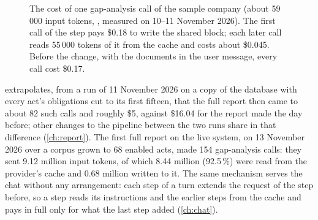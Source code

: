 \begin{figure}[H]
\centering
{}
\caption{The cost of one gap-analysis call of the sample company (about 59\,000 input
tokens, , measured on 10--11 November 2026). The first call of the step
pays \$0.18 to write the shared block; each later call reads 55\,000 tokens of it from the
cache and costs about \$0.045. Before the change, with the documents in the user message,
every call cost \$0.17.}\label{fig:models:cachecost}
\end{figure}

 extrapolates, from a run of 11 November 2026 on a copy of the
database with every act's obligations cut to its first fifteen, that the full report then
came to about 82 such calls and roughly \$5, against \$16.04 for the report made the day
before; other changes to the pipeline between the two runs share in that difference
(\cref{ch:report}). The first full report on the live system, on 13 November 2026 over a
corpus grown to 68 enabled acts, made 154 gap-analysis calls: they sent 9.12 million input
tokens, of which 8.44 million (92.5\,\%) were read from the provider's cache and 0.68 million
written to it. The same mechanism serves the chat without any arrangement:
each step of a turn extends the request of the step before, so a step reads its instructions
and the earlier steps from the cache and pays in full only for what the last step added
(\cref{ch:chat}).

